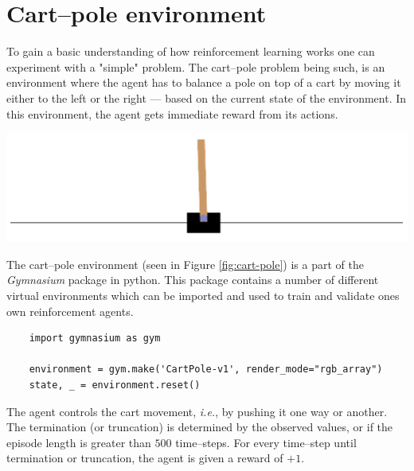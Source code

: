 \documentclass{article}
\let\oldcite\cite
\renewcommand{\cite}[1]{\textbf{\oldcite{#1}}}
\begin{document}
\hypertarget{seq:cart-pole}{}
\section*{Cart–pole environment}

\begin{minipage}{.5\textwidth}
  To gain a basic understanding of how reinforcement learning works one can experiment with a "simple" problem. The cart–pole problem being such, is an environment where the agent has to balance a pole on top of a cart by moving it either to the left or the right — based on the current state of the environment. In this environment, the agent gets immediate reward from its actions.
\end{minipage}%
\begin{minipage}{.5\textwidth}
    \centering
    \includegraphics[width=.8\linewidth]{images/cart-pole.png}
    \label{fig:cart-pole}
\end{minipage}

\vspace{0.2cm}

The cart–pole environment (seen in Figure \ref{fig:cart-pole}) is a part of the \textit{Gymnasium} package in python. This package contains a number of different virtual environments which can be imported and used to train and validate ones own reinforcement agents. \cite{Gymnasium} \cite{Cart-pole}

\vspace{0.2cm}

\begin{lstlisting}
    import gymnasium as gym

    environment = gym.make('CartPole-v1', render_mode="rgb_array")
    state, _ = environment.reset()
\end{lstlisting}

The agent controls the cart movement, \textit{i.e.}, by pushing it one way or another. The termination (or truncation) is determined by the observed values, or if the episode length is greater than $500$ time–steps. For every time–step until termination or truncation, the agent is given a reward of $+1$.
\end{document}
